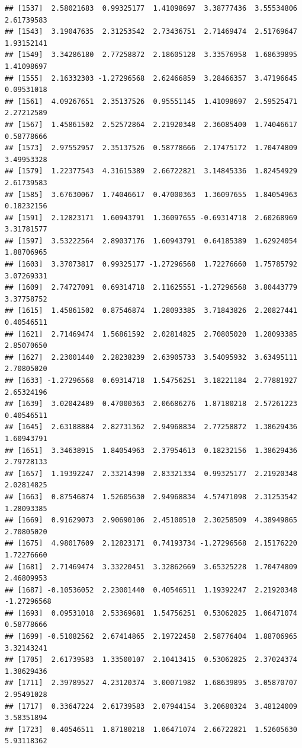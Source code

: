 \documentclass[
]{article}
\begin{document}
\begin{verbatim}
## [1537]  2.58021683  0.99325177  1.41098697  3.38777436  3.55534806  2.61739583
## [1543]  3.19047635  2.31253542  2.73436751  2.71469474  2.51769647  1.93152141
## [1549]  3.34286180  2.77258872  2.18605128  3.33576958  1.68639895  1.41098697
## [1555]  2.16332303 -1.27296568  2.62466859  3.28466357  3.47196645  0.09531018
## [1561]  4.09267651  2.35137526  0.95551145  1.41098697  2.59525471  2.27212589
## [1567]  1.45861502  2.52572864  2.21920348  2.36085400  1.74046617  0.58778666
## [1573]  2.97552957  2.35137526  0.58778666  2.17475172  1.70474809  3.49953328
## [1579]  1.22377543  4.31615389  2.66722821  3.14845336  1.82454929  2.61739583
## [1585]  3.67630067  1.74046617  0.47000363  1.36097655  1.84054963  0.18232156
## [1591]  2.12823171  1.60943791  1.36097655 -0.69314718  2.60268969  3.31781577
## [1597]  3.53222564  2.89037176  1.60943791  0.64185389  1.62924054  1.88706965
## [1603]  3.37073817  0.99325177 -1.27296568  1.72276660  1.75785792  3.07269331
## [1609]  2.74727091  0.69314718  2.11625551 -1.27296568  3.80443779  3.37758752
## [1615]  1.45861502  0.87546874  1.28093385  3.71843826  2.20827441  0.40546511
## [1621]  2.71469474  1.56861592  2.02814825  2.70805020  1.28093385  2.85070650
## [1627]  2.23001440  2.28238239  2.63905733  3.54095932  3.63495111  2.70805020
## [1633] -1.27296568  0.69314718  1.54756251  3.18221184  2.77881927  2.65324196
## [1639]  3.02042489  0.47000363  2.06686276  1.87180218  2.57261223  0.40546511
## [1645]  2.63188884  2.82731362  2.94968834  2.77258872  1.38629436  1.60943791
## [1651]  3.34638915  1.84054963  2.37954613  0.18232156  1.38629436  2.79728133
## [1657]  1.19392247  2.33214390  2.83321334  0.99325177  2.21920348  2.02814825
## [1663]  0.87546874  1.52605630  2.94968834  4.57471098  2.31253542  1.28093385
## [1669]  0.91629073  2.90690106  2.45100510  2.30258509  4.38949865  2.70805020
## [1675]  4.98017609  2.12823171  0.74193734 -1.27296568  2.15176220  1.72276660
## [1681]  2.71469474  3.33220451  3.32862669  3.65325228  1.70474809  2.46809953
## [1687] -0.10536052  2.23001440  0.40546511  1.19392247  2.21920348 -1.27296568
## [1693]  0.09531018  2.53369681  1.54756251  0.53062825  1.06471074  0.58778666
## [1699] -0.51082562  2.67414865  2.19722458  2.58776404  1.88706965  3.32143241
## [1705]  2.61739583  1.33500107  2.10413415  0.53062825  2.37024374  1.38629436
## [1711]  2.39789527  4.23120374  3.00071982  1.68639895  3.05870707  2.95491028
## [1717]  0.33647224  2.61739583  2.07944154  3.20680324  3.48124009  3.58351894
## [1723]  0.40546511  1.87180218  1.06471074  2.66722821  1.52605630  5.93118362

\end{verbatim}
\end{document}
